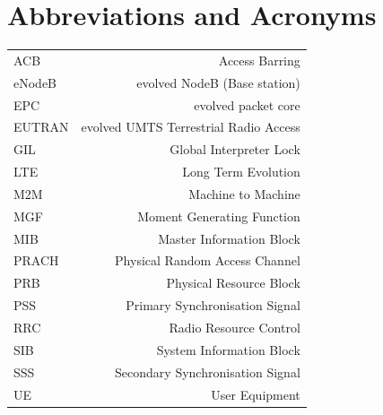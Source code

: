 \documentclass[conference]{IEEEtran}
\begin{document}
\section*{Abbreviations and Acronyms}
    \begin{tabular}{l r}
        ACB & Access Barring\\
        eNodeB & evolved NodeB (Base station)\\
        EPC & evolved packet core\\
        EUTRAN & evolved UMTS Terrestrial Radio Access\\
        GIL & Global Interpreter Lock\\
        LTE & Long Term Evolution\\
        M2M & Machine to Machine\\
        MGF & Moment Generating Function\\
        MIB & Master Information Block\\
        PRACH & Physical Random Access Channel\\
        PRB & Physical Resource Block\\
        PSS & Primary Synchronisation Signal\\
        RRC & Radio Resource Control\\
        SIB & System Information Block\\
        SSS & Secondary Synchronisation Signal\\
        UE & User Equipment\\
    \end{tabular}
%
%
\end{document}
